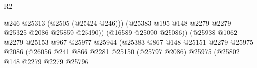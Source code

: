 \begin{lexlean}{R2}
\begin{coremodule}
                                                              @246
                                                              @25313
                                                              (@2505 (@25424 @246)))
                                                            (@25383
                                                              @195
                                                              @148
                                                              @2279
                                                              @2279
                                                              @25325
                                                              @2086
                                                              @25859
                                                              @25490))
                                                          (@16589 @25090 @25086))
                                                        (@25938
                                                          @1062
                                                          @2279
                                                          @25153
                                                          @967
                                                          @25977
                                                          @25944
                                                          (@25383
                                                            @867
                                                            @148
                                                            @25151
                                                            @2279
                                                            @25975
                                                            @2086
                                                            (@26056
                                                              @241
                                                              @866
                                                              @2281
                                                              @25150
                                                              (@25797 @2086)
                                                              @25975
                                                              (@25802
                                                                @148
                                                                @2279
                                                                @2279
                                                                @25796

\end{coremodule}
\end{lexlean}
